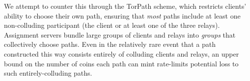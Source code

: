 We attempt to counter this through the TorPath scheme,
which restricts clients' ability to choose their own path,
ensuring that {\em most} paths include at least one non-colluding participant
(the client or at least one of the three relays).
Assignment servers bundle large groups of
clients and relays into {\em groups} that collectively choose paths.
Even in the relatively rare event that a path constructed this way
consists entirely of colluding clients and relays,
an upper bound on the number of coins each path can mint
rate-limits potential loss to such entirely-colluding paths.







